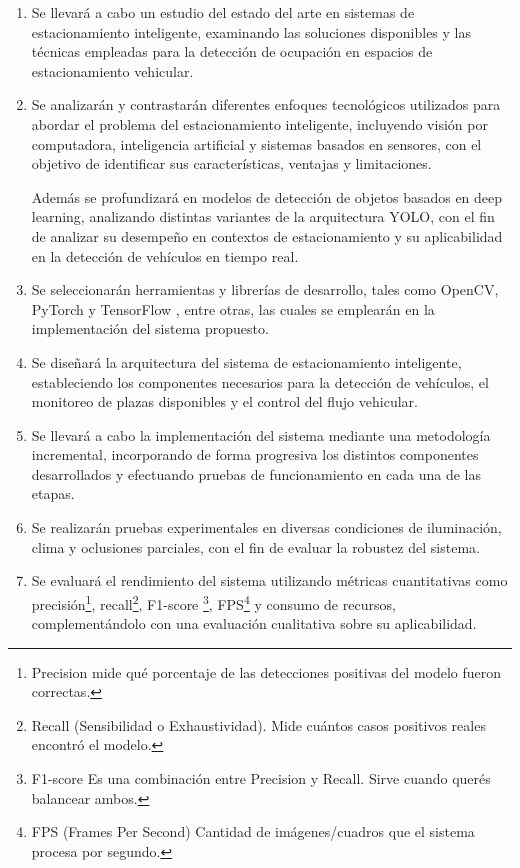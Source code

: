 \documentclass[12pt,a4paper]{article}
\begin{document}
\begin{enumerate}[{Actividad} 1]
 \item  Se llevará a cabo un estudio del estado del arte en sistemas de estacionamiento inteligente, examinando las soluciones disponibles y las técnicas empleadas para la detección de ocupación en espacios de estacionamiento vehicular. 
 
\item  Se analizarán y contrastarán diferentes enfoques tecnológicos utilizados para abordar el problema del estacionamiento inteligente, incluyendo visión por computadora, inteligencia artificial y sistemas basados en sensores, con el objetivo de identificar sus características, ventajas y limitaciones.

Además se profundizará en modelos de detección de objetos basados en deep learning, analizando distintas variantes de la arquitectura YOLO, con el fin de analizar su desempeño en contextos de estacionamiento y su aplicabilidad en la detección de vehículos en tiempo real.

\item Se seleccionarán  herramientas y librerías de desarrollo, tales como OpenCV, PyTorch y TensorFlow , entre otras, las cuales se emplearán en la implementación del sistema propuesto.


\item Se diseñará la arquitectura del sistema de estacionamiento inteligente, estableciendo los componentes necesarios para la detección de vehículos, el monitoreo de plazas disponibles y el control del flujo vehicular.

\item Se llevará a cabo la implementación del sistema mediante una metodología incremental, incorporando de forma progresiva los distintos componentes desarrollados y efectuando pruebas de funcionamiento en cada una de las etapas.

\item Se realizarán  pruebas experimentales en diversas condiciones de iluminación, clima y oclusiones parciales, con el fin de evaluar la robustez del sistema.

\item Se evaluará el rendimiento del sistema utilizando métricas cuantitativas como precisión\footnote{Precision mide qué porcentaje de las detecciones positivas del modelo fueron correctas.}, recall\footnote{Recall (Sensibilidad o Exhaustividad).
Mide cuántos casos positivos reales encontró el modelo.}, F1-score \footnote{F1-score
Es una combinación entre Precision y Recall.
Sirve cuando querés balancear ambos.}, FPS\footnote{FPS (Frames Per Second)
Cantidad de imágenes/cuadros que el sistema procesa por segundo.} y consumo de recursos, complementándolo con una evaluación cualitativa sobre su aplicabilidad.


\end{enumerate}
\end{document}
